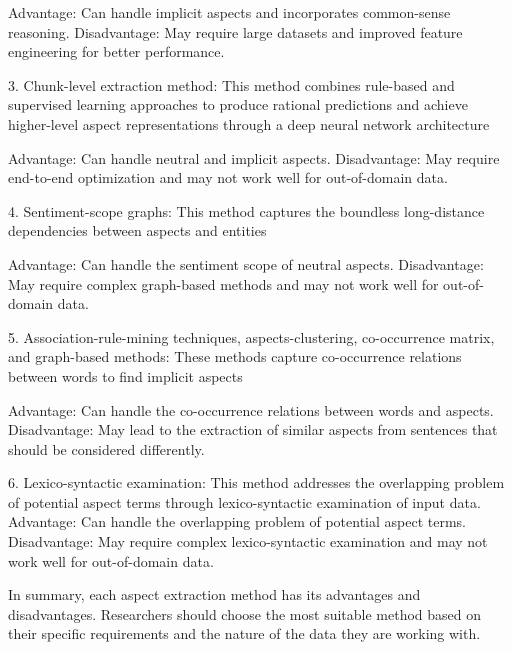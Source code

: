 Advantage: Can handle implicit aspects and incorporates common-sense reasoning.
Disadvantage: May require large datasets and improved feature engineering for better performance.

3. Chunk-level extraction method: This method combines rule-based and supervised learning approaches to produce rational predictions and achieve higher-level aspect representations through a deep neural network architecture

Advantage: Can handle neutral and implicit aspects.
Disadvantage: May require end-to-end optimization and may not work well for out-of-domain data.

4. Sentiment-scope graphs: This method captures the boundless long-distance dependencies between aspects and entities

Advantage: Can handle the sentiment scope of neutral aspects.
Disadvantage: May require complex graph-based methods and may not work well for out-of-domain data.

5. Association-rule-mining techniques, aspects-clustering, co-occurrence matrix, and graph-based methods: These methods capture co-occurrence relations between words to find implicit aspects

Advantage: Can handle the co-occurrence relations between words and aspects.
Disadvantage: May lead to the extraction of similar aspects from sentences that should be considered differently.

6. Lexico-syntactic examination: This method addresses the overlapping problem of potential aspect terms through lexico-syntactic examination of input data.
Advantage: Can handle the overlapping problem of potential aspect terms.
Disadvantage: May require complex lexico-syntactic examination and may not work well for out-of-domain data.

In summary, each aspect extraction method has its advantages and disadvantages. Researchers should choose the most suitable method based on their specific requirements and the nature of the data they are working with.
